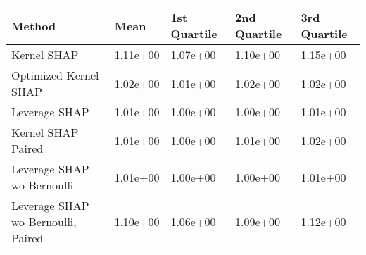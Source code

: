 \begin{tabular}{lllll}
  \toprule
  \textbf{Method} & \textbf{Mean} & \textbf{1st Quartile} & \textbf{2nd Quartile} & \textbf{3rd Quartile} \\ \midrule 
Kernel SHAP & 1.11e+00 & 1.07e+00 & 1.10e+00 & 1.15e+00\\
Optimized Kernel SHAP & 1.02e+00 & 1.01e+00 & 1.02e+00 & \cellcolor{bronze!60}1.02e+00\\
Leverage SHAP & \cellcolor{gold!60}1.01e+00 & \cellcolor{gold!60}1.00e+00 & \cellcolor{gold!60}1.00e+00 & \cellcolor{gold!60}1.01e+00\\
Kernel SHAP Paired & \cellcolor{gold!60}1.01e+00 & \cellcolor{gold!60}1.00e+00 & \cellcolor{bronze!60}1.01e+00 & \cellcolor{bronze!60}1.02e+00\\
Leverage SHAP wo Bernoulli & \cellcolor{gold!60}1.01e+00 & \cellcolor{gold!60}1.00e+00 & \cellcolor{gold!60}1.00e+00 & \cellcolor{gold!60}1.01e+00\\
Leverage SHAP wo Bernoulli, Paired & 1.10e+00 & 1.06e+00 & 1.09e+00 & 1.12e+00\\
\bottomrule
\end{tabular}